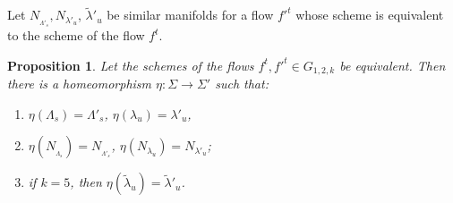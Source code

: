 \documentclass[%
 aip,
 amsmath,amssymb,
preprint,%
]{revtex4-1}
\newtheorem{propos}{Proposition}
\begin{document}
Let $N_{_{\Lambda'_s}}, N_{\lambda'_u}$, $\widetilde \lambda'_u$ be similar manifolds for a flow ${f'}^t$ whose scheme is equivalent to the scheme of the flow $f^t$.

\begin{propos}\label{Step0} Let the schemes of the flows $f^t, {f'}^t\in G_{1,2,k}$ be equivalent. Then there is a homeomorphism $\eta: \Sigma\to \Sigma'$ such that:
\begin{enumerate}
\item $\eta(\Lambda_s)=\Lambda'_s$, $\eta(\lambda_u)=\lambda'_u$,
\item $\eta(N_{_{\Lambda_s}})=N_{_{\Lambda'_s}}$, $\eta(N_{\lambda_u})=N_{\lambda'_u}$;
\item if $k=5$, then $\eta(\widetilde \lambda_u)=\widetilde \lambda'_u$.
\end{enumerate}
\end{propos}
\end{document}
